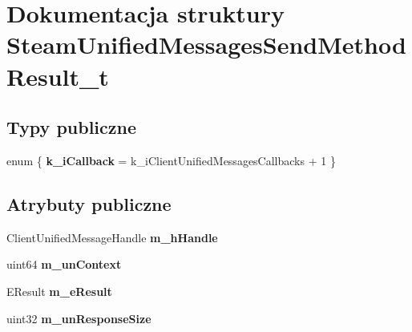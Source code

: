 \hypertarget{struct_steam_unified_messages_send_method_result__t}{}\section{Dokumentacja struktury Steam\+Unified\+Messages\+Send\+Method\+Result\+\_\+t}
\label{struct_steam_unified_messages_send_method_result__t}
\subsection*{Typy publiczne}
\begin{DoxyCompactItemize}
\item 
\mbox{\label{struct_steam_unified_messages_send_method_result__t_a9f702ac1f72ded0deccbf635ca4e922b}} 
enum \{ {\bfseries k\+\_\+i\+Callback} = k\+\_\+i\+Client\+Unified\+Messages\+Callbacks + 1
 \}
\end{DoxyCompactItemize}
\subsection*{Atrybuty publiczne}
\begin{DoxyCompactItemize}
\item 
\mbox{\label{struct_steam_unified_messages_send_method_result__t_ad8db3c4f7487309453ebdc4d16f61a46}} 
Client\+Unified\+Message\+Handle {\bfseries m\+\_\+h\+Handle}
\item 
\mbox{\label{struct_steam_unified_messages_send_method_result__t_a098ff61718969c9438e836aef392657a}} 
uint64 {\bfseries m\+\_\+un\+Context}
\item 
\mbox{\label{struct_steam_unified_messages_send_method_result__t_a2edf40e094c42570509c3c809933d274}} 
E\+Result {\bfseries m\+\_\+e\+Result}
\item 
\mbox{\label{struct_steam_unified_messages_send_method_result__t_a4628e66007485646b5564c73b3d92619}} 
uint32 {\bfseries m\+\_\+un\+Response\+Size}
\end{DoxyCompactItemize}


